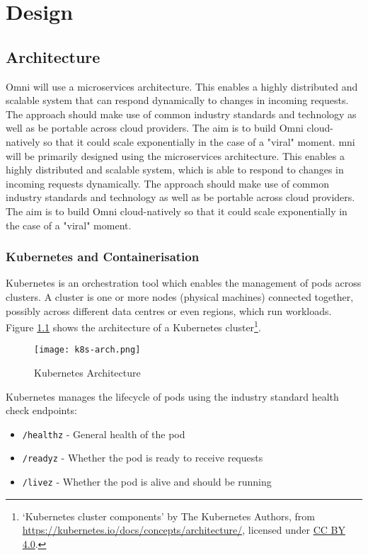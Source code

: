 \chapter{Design}
\label{cha:design}

\section{Architecture}
\label{sec:design-architecture}
Omni will use a microservices architecture. This enables a highly distributed and scalable system that can respond dynamically to changes in incoming requests.
The approach should make use of common industry standards and technology as well as be portable across cloud providers. The aim is to build Omni cloud-natively so that it could scale exponentially in the case of a "viral" moment.
mni will be primarily designed using the microservices architecture. This enables a highly distributed and scalable system, which is able to respond to changes in incoming requests dynamically. 
The approach should make use of common industry standards and technology as well as be portable across cloud providers. The aim is to build Omni cloud-natively so that it could scale exponentially in the case of a "viral" moment.

\subsection{Kubernetes and Containerisation}
\label{sec:design-system-kubernetes}
Kubernetes is an orchestration tool which enables the management of pods across clusters. A cluster is one or more nodes (physical machines) connected together, possibly across different data centres or even regions, which run workloads.
Figure \ref{fig:k8s-arch} shows the architecture of a Kubernetes cluster\footnote{`Kubernetes cluster components' by The Kubernetes Authors, from \url{https://kubernetes.io/docs/concepts/architecture/}, licensed under \href{https://creativecommons.org/licenses/by/4.0/}{CC BY 4.0}.}.

\begin{figure}[htbp]
\texttt{[image: k8s-arch.png]}
\centering
\caption{Kubernetes Architecture}
\label{fig:k8s-arch}
\end{figure}

Kubernetes manages the lifecycle of pods using the industry standard health check endpoints:
\begin{itemize}
    \item \texttt{/healthz} - General health of the pod
    \item \texttt{/readyz} - Whether the pod is ready to receive requests
    \item \texttt{/livez} - Whether the pod is alive and should be running
\end{itemize}

